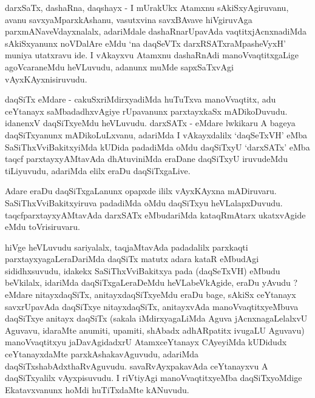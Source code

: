 \begin{artha}
darxSaTx, dashaRna, daqshayx - I mUrakUkx Atamxnu sAkiSxyAgiruvanu, avanu savxyaMparxkAshanu, vasutxvina savxBAvave hiVgiruvAga parxmANaveVdayxnalalx, adariMdale dashaRnarUpavAda vaqtitxjAcnxnadiMda sAkiSxyanunx noVDalAre eMdu `na daqSeVTx darxRSATxraMpasheVyxH' muniya utatxravu ide. I vAkayxvu Atamxnu dashaRnAdi manoVvaqtitxgaLige agoVcaraneMdu heVLuvudu, adanunx muMde sapxSaTxvAgi vAyxKAyxnisiruvudu.
\end{artha}


\begin{artha}
daqSiTx eMdare - cakuSxriMdirxyadiMda huTuTxva manoVvaqtitx, adu ceYtanayx saMbadadhxvAgiye rUpavanunx parxtayxkaSx mADikoDuvudu. idanenxV daqSiTxyeMdu heVLuvudu. darxSATx - eMdare lwkikaru A bageya daqSiTxyanunx mADikoLuLxvanu, adariMda I vAkayxdalilx `daqSeTxVH' eMba SaSiThxVviBakitxyiMda kUDida padadiMda oMdu daqSiTxyU `darxSATx' eMba taqcf parxtayxyAMtavAda dhAtuviniMda eraDane daqSiTxyU iruvudeMdu tiLiyuvudu, adariMda elilx eraDu daqSiTxgaLive.
\end{artha}


\begin{artha}
Adare eraDu daqSiTxgaLanunx opapxde ililx vAyxKAyxna mADiruvaru. SaSiThxVviBakitxyiruva padadiMda oMdu daqSiTxyu heVLalapxDuvudu. taqcfparxtayxyAMtavAda darxSATx eMbudariMda kataqRmAtarx ukatxvAgide eMdu toVrisiruvaru.
\end{artha}


\begin{artha}
hiVge heVLuvudu sariyalalx, taqjaMtavAda padadalilx parxkaqti parxtayxyagaLeraDariMda daqSiTx matutx adara kataR eMbudAgi sididhxsuvudu, idakekx SaSiThxVviBakitxya pada (daqSeTxVH) eMbudu beVkilalx, idariMda daqSiTxgaLeraDeMdu heVLabeVkAgide, eraDu yAvudu ? eMdare nitayxdaqSiTx, anitayxdaqSiTxyeMdu eraDu bage, sAkiSx ceYtanayx savxrUpavAda daqSiTxye nitayxdaqSiTx, anitayxvAda manoVvaqtitxyeMbuva daqSiTxye anitayx daqSiTx (sakala iMdirxyagaLiMda Aguva jAcnxnagaLelalxvU Aguvavu, idaraMte anumiti, upamiti, shAbadx adhARpatitx ivugaLU Aguvavu) manoVvaqtitxyu jaDavAgidadxrU AtamxceYtanayx CAyeyiMda kUDidudx ceYtanayxdaMte parxkAshakavAguvudu, adariMda daqSiTxshabAdxthaRvAguvudu. savaRvAyxpakavAda ceYtanayxvu A daqSiTxyalilx vAyxpisuvudu. I riVtiyAgi manoVvaqtitxyeMba daqSiTxyoMdige Ekatavxvanunx hoMdi huTiTxdaMte kANuvudu.
\end{artha}

